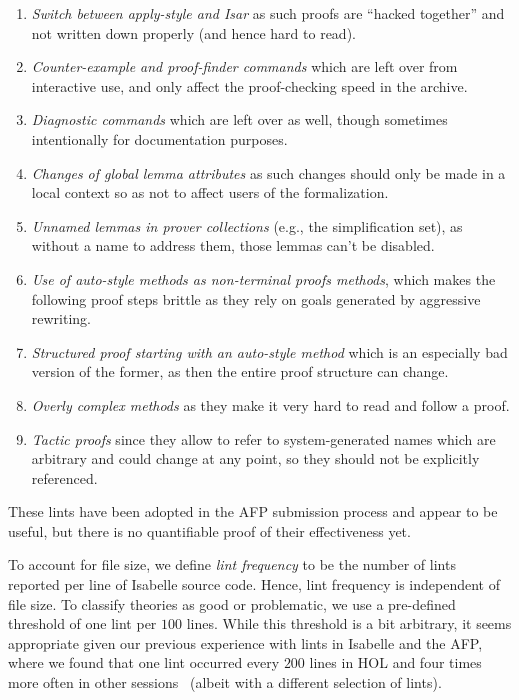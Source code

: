 \begin{enumerate}
\item \emph{Switch between apply-style and Isar}
as such proofs are \enquote{hacked together} and not written down properly
(and hence hard to read).
\item \emph{Counter-example and proof-finder commands}
which are left over from interactive use,
and only affect the proof-checking speed in the archive.
\item \emph{Diagnostic commands} which are left over as well,
though sometimes intentionally for documentation purposes.
\item \emph{Changes of global lemma attributes}
as such changes should only be made in a local context
so as not to affect users of the formalization.
\item \emph{Unnamed lemmas in prover collections}
(e.g., the simplification set),
as without a name to address them, those lemmas can't be disabled.
\item \emph{Use of auto-style methods as non-terminal proofs methods},
which makes the following proof steps brittle as they rely on goals generated by aggressive rewriting.
\item \emph{Structured proof starting with an auto-style method} which is an especially bad version of the former,
as then the entire proof structure can change.
\item \emph{Overly complex methods}
as they make it very hard to read and follow a proof.
\item \emph{Tactic proofs}
since they allow to refer to system-generated names
which are arbitrary and could change at any point,
so they should not be explicitly referenced.
\end{enumerate}
These lints have been adopted in the AFP submission process and appear to be useful,
but there is no quantifiable proof of their effectiveness yet.

To account for file size,
we define \emph{lint frequency} to be the number of lints reported per line of Isabelle source code.
Hence, lint frequency is independent of file size.
To classify theories as good or problematic,
we use a pre-defined threshold of one lint per $100$ lines.
While this threshold is a bit arbitrary,
it seems appropriate given our previous experience with lints in Isabelle and the AFP,
where we found that one lint occurred every $200$ lines in HOL and four times more often in other sessions~\cite{Linter2022Megdiche}
(albeit with a different selection of lints).

